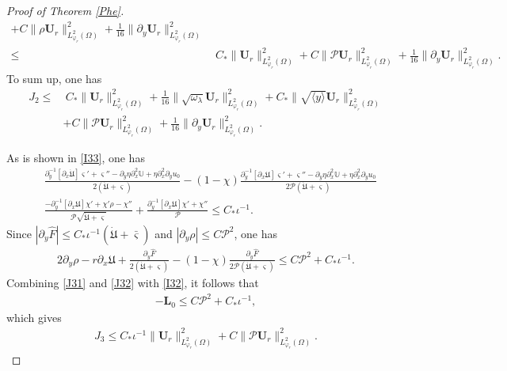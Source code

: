 \documentclass[10pt,a4paper]{amsart}
\newcommand\y{{{\langle y \rangle}}}
\begin{document}
\begin{proof}[Proof of Theorem \ref{Phe}]
\begin{align*}
     +C\|\rho\mathbf{U}_{r}\|_{L_{\varphi_{r}}^{2}(\Omega)}^{2}
     +\frac{1}{16}\|\partial_{y}\mathbf{U}_{r}\|_{L_{\varphi_{r}}^{2}(\Omega)}^{2}\\
\leq&~C_{*}\|\mathbf{U}_{r}\|_{L_{\varphi_{r}}^{2}(\Omega)}^{2}
     +C\|\mathcal{P}\mathbf{U}_{r}\|_{L_{\varphi_{r}}^{2}(\Omega)}^{2}
     +\frac{1}{16}\|\partial_{y}\mathbf{U}_{r}\|_{L_{\varphi_{r}}^{2}(\Omega)}^{2}.
\end{align*}
To sum up, one has
\begin{align*}
J_{2}
\leq&~C_{*}\|\mathbf{U}_{r}\|_{L_{\varphi_{r}}^{2}(\Omega)}^{2}
     +\frac{1}{16}\|\sqrt{\omega_{\lambda}}\mathbf{U}_{r}\|_{L_{\varphi_{r}}^{2}(\Omega)}^{2}
     +C_{*}\|\sqrt{\y}\mathbf{U}_{r}\|_{L_{\varphi_{r}}^{2}(\Omega)}^{2}\\
    &+C\|\mathcal{P}\mathbf{U}_{r}\|_{L_{\varphi_{r}}^{2}(\Omega)}^{2}
     +\frac{1}{16}\|\partial_{y}\mathbf{U}_{r}\|_{L_{\varphi_{r}}^{2}(\Omega)}^{2}.
\end{align*}

As is shown in \eqref{I33}, one has
\begin{align}\label{J31}
&\frac{\partial_{y}^{-1}\left[\partial_{x}\dot{\mathfrak{U}}\right]\varsigma'+\varsigma''-\partial_{y}\eta\partial_{x}^{2}\mathbb{U}+\eta\partial_{x}^{2}\partial_{y}u_{0}}{2(\dot{\mathfrak{U}}+\varsigma)}
 -(1-\chi)\frac{\partial_{y}^{-1}\left[\partial_{x}\mathfrak{U}\right]\varsigma'+\varsigma''-\partial_{y}\eta\partial_{x}^{2}\mathbb{U}+\eta\partial_{x}^{2}\partial_{y}u_{0}}{2\mathcal{P}(\dot{\mathfrak{U}}+\varsigma)}\\
&\frac{-\partial_{y}^{-1}[\partial_{x}\mathfrak{U}]\chi'+\chi'\rho-\chi''}{\mathcal{P}\sqrt{\dot{\mathfrak{U}}+\varsigma}}
+\frac{\partial_{y}^{-1}\left[\partial_{x}\mathfrak{U}\right]\chi'+\chi''}{\mathcal{P}}
\leq C_{*}\iota^{-1}.\nonumber
\end{align}
Since $|\partial_{y}\hat{F}|\leq C_{*}\iota^{-1}(\dot{\mathfrak{U}}+\bar{\varsigma})$ and $|\partial_{y}\rho|\leq C\mathcal{P}^{2}$, one has
\begin{align}\label{J32}
2\partial_{y}\rho-r\partial_{x}\mathfrak{U}
+\frac{\partial_{y}\hat{F}}{2(\dot{\mathfrak{U}}+\varsigma)}
-(1-\chi)\frac{\partial_{y}\hat{F}}{2\mathcal{P}(\dot{\mathfrak{U}}+\varsigma)}\leq C\mathcal{P}^{2}+C_{*}\iota^{-1}.
\end{align}
Combining \eqref{J31} and \eqref{J32} with \eqref{I32}, it follows that
\begin{align*}
-\mathbf{L}_{0}\leq C\mathcal{P}^{2}+C_{*}\iota^{-1},
\end{align*}
which gives
\begin{align*}
J_{3}
\leq C_{*}\iota^{-1}\|\mathbf{U}_{r}\|_{L_{\varphi_{r}}^{2}(\Omega)}^{2}
    +C\|\mathcal{P}\mathbf{U}_{r}\|_{L_{\varphi_{r}}^{2}(\Omega)}^{2}.
\end{align*}


\end{proof}
\end{document}
